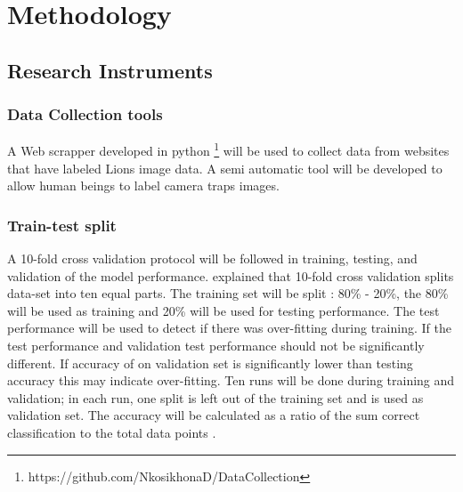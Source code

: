 \section{Methodology}\label{methodology}
\subsection{Research Instruments} %
\subsubsection{Data Collection tools}
A Web scrapper developed in python \footnote{https://github.com/NkosikhonaD/DataCollection} will be used to collect data from websites that have labeled Lions image data.  
 A semi automatic tool will be developed to allow human beings to label camera traps images. 
 
\subsubsection{Train-test split}
A 10-fold cross validation protocol will be followed in training, testing, and validation of the model performance. \citeauthor{kohavi1995study} \citeyear{kohavi1995study} \cite{kohavi1995study} explained that 10-fold cross validation splits data-set into ten equal parts. The training set will be split : 80\% - 20\%, the 80\% will be used as training and 20\% will be used for testing performance. The test performance will be used to detect if there was over-fitting during training. If the test performance and validation test performance should not be significantly different. If accuracy of on validation set is significantly lower than testing accuracy this may indicate over-fitting. Ten runs will be done during training and validation; in each run, one split is left out of the training set and is used as validation set. The accuracy will be calculated as a ratio of the sum correct classification to the total data points \cite{witten2016data}.

